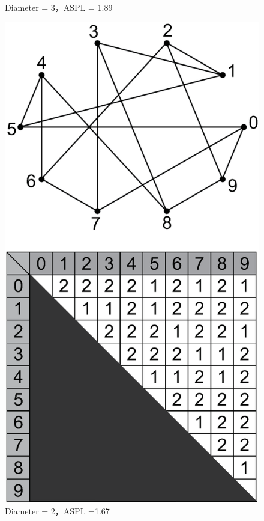 \documentclass[graybox]{svmult}
\begin{document}
\begin{figure}[t]
\begin{minipage}{0.5\hsize}
\begin{center}
\caption{Diameter = 3，ASPL = 1.89}\label{fig:example-random}
  \end{center}
 \end{minipage}
 \begin{minipage}{0.5\hsize}
  \begin{center}
\includegraphics[scale=0.25,clip]{img/n10d3-opt.eps}
\caption{Diameter = 2，ASPL =1.67}\label{fig:example-opt}
  \end{center}
 \end{minipage}
\end{figure}
\end{document}

